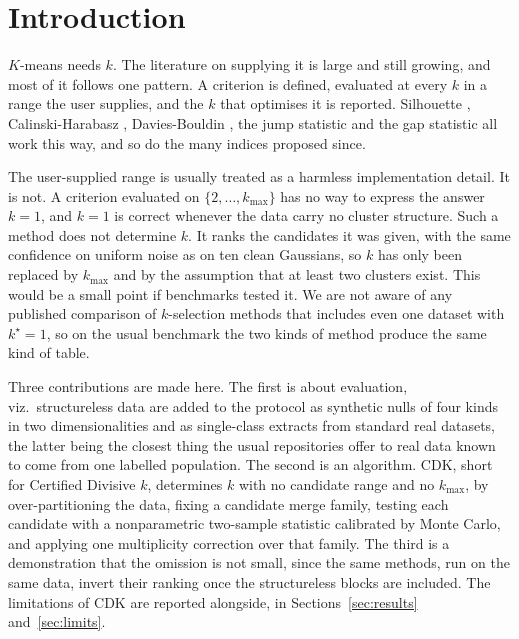 \documentclass[runningheads]{llncs}
\begin{document}
\section{Introduction}

$K$-means needs $k$. The literature on supplying it is large and still
growing, and most of it follows one pattern. A criterion is defined, evaluated
at every $k$ in a range the user supplies, and the $k$ that optimises it is
reported. Silhouette \cite{rousseeuw1987silhouettes}, Calinski-Harabasz
\cite{calinski1974dendrite}, Davies-Bouldin \cite{davies1979cluster}, the jump
statistic \cite{sugar2003finding} and the gap statistic
\cite{tibshirani2001gap} all work this way, and so do the many indices
proposed since.

The user-supplied range is usually treated as a harmless implementation
detail. It is not. A criterion evaluated on $\{2,\dots,k_{\max}\}$ has no way
to express the answer $k=1$, and $k=1$ is correct whenever the data carry no
cluster structure. Such a method does not determine $k$. It ranks the
candidates it was given, with the same confidence on uniform noise as on ten
clean Gaussians, so $k$ has only been replaced by $k_{\max}$ and by the
assumption that at least two clusters exist. This would be a small point if
benchmarks tested it. We are not aware of any published comparison of
$k$-selection methods that includes even one dataset with $k^\star = 1$, so on
the usual benchmark the two kinds of method produce the same kind of table.

Three contributions are made here. The first is about evaluation, viz.\
structureless data are added to the protocol as synthetic nulls of four kinds
in two dimensionalities and as \nNREALNULL{} single-class extracts from
standard real datasets, the latter being the closest thing the usual
repositories offer to real data known to come from one labelled population.
The second is an algorithm. CDK, short for Certified Divisive $k$, determines
$k$ with no candidate range and no $k_{\max}$, by over-partitioning the data,
fixing a candidate merge family, testing each candidate with a nonparametric
two-sample statistic calibrated by Monte Carlo, and applying one multiplicity
correction over that family. The third is a demonstration that the omission is
not small, since the same \nNMETH{} methods, run on the same data, invert
their ranking once the structureless blocks are included. The limitations of
CDK are reported alongside, in Sections~\ref{sec:results}
and~\ref{sec:limits}.
\end{document}

